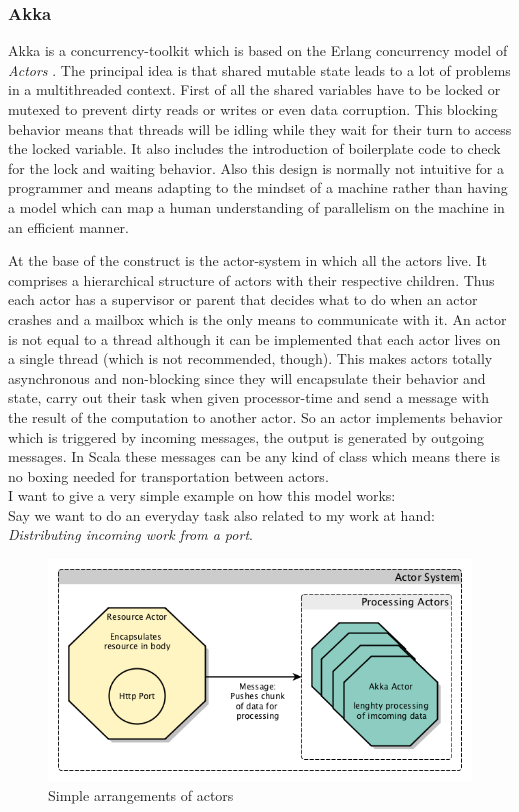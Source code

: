 \documentclass[11p]{scrartcl}
\begin{document}
\subsubsection{Akka}
\label{sec:akka}
Akka \citep{link:akkaHome} is a concurrency-toolkit which is based on the Erlang concurrency model of \textit{Actors} \cite{link:erlangConcurrency}.
The principal idea is that shared mutable state leads to a lot of problems in a multithreaded context. First of all the shared variables have to be locked or mutexed to prevent dirty reads or writes or even data corruption. This blocking behavior means that threads will be idling while they wait for their turn to access the locked variable. It also includes the introduction of boilerplate code to check for the lock and waiting behavior. Also this design is normally not intuitive for a programmer and means adapting to the mindset of a machine rather than having a model which can map a human understanding of parallelism on the machine in an efficient manner.

At the base of the construct is the actor-system in which all the actors live. It comprises a hierarchical structure of actors with their respective children. Thus each actor has a supervisor or parent that decides what to do when an actor crashes and a mailbox which is the only means to communicate with it. An actor is not equal to a thread although it can be implemented that each actor lives on a single thread (which is not recommended, though).
This makes actors totally asynchronous and non-blocking since they will encapsulate their behavior and state, carry out their task when given processor-time and send a message with the result of the computation to another actor. So an actor implements behavior which is triggered by incoming messages, the output is generated by outgoing messages. In Scala these messages can be any kind of class which means there is no boxing needed for transportation between actors.\\

I want to give a very simple example on how this model works:\\
Say we want to do an everyday task also related to my work at hand: \textit{Distributing incoming work from a port}.

\begin{figure}[h]		
 	\includegraphics[scale=0.4]{figures/akkaExample1.png}
	\caption{Simple arrangements of actors}
	\label{fig:akkaExample1}
\end{figure}
\end{document}

